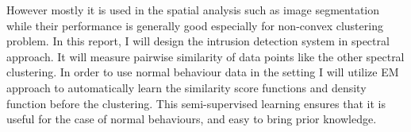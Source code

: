 However mostly it is used in the spatial analysis such as image segmentation while their performance is generally good especially for non-convex clustering problem. 
In this report, I will design the intrusion detection system in spectral approach. 
It will measure pairwise similarity of data points like the other spectral clustering. 
In order to use normal behaviour data in the setting I will utilize EM approach to automatically learn the similarity score functions and density function before the clustering. 
This semi-supervised learning ensures that it is useful for the case of normal behaviours, and easy to bring prior knowledge. 
